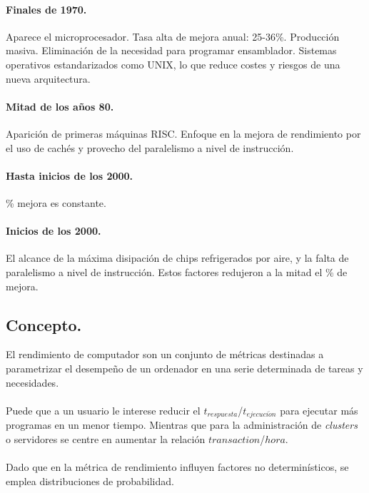 \documentclass{article}
\begin{document}
\begin{multicols}{2}
		\paragraph{Finales de 1970.} Aparece el microprocesador. Tasa alta de mejora anual: 25-36\%. Producción masiva. Eliminación de la necesidad para programar ensamblador. Sistemas operativos estandarizados como UNIX, lo que reduce costes y riesgos de una nueva arquitectura.
		\paragraph{Mitad de los años 80.} Aparición de primeras máquinas RISC. Enfoque en la mejora de rendimiento por el uso de cachés y provecho del paralelismo a nivel de instrucción.
		\paragraph{Hasta inicios de los 2000.} \% mejora es constante.
		\paragraph{Inicios de los 2000.} El alcance de la máxima disipación de chips refrigerados por aire, y la falta de paralelismo a nivel de instrucción. Estos factores redujeron a la mitad el \% de mejora.
		
		\subsection{Concepto.}
		El rendimiento de computador son un conjunto de métricas destinadas a parametrizar el desempeño de un ordenador en una serie determinada de tareas y necesidades.
		
		\paragraph{}
		Puede que a un usuario le interese reducir el $t_{respuesta}$/$t_{ejecuci\acute{o}n}$ para ejecutar más programas en un menor tiempo. Mientras que para la administración de \textit{clusters} o servidores se centre en aumentar la relación $transaction$/$hora$.
		
		\paragraph{}
		Dado que en la métrica de rendimiento influyen factores no determinísticos, se emplea distribuciones de probabilidad.
		

\end{multicols}
\end{document}
